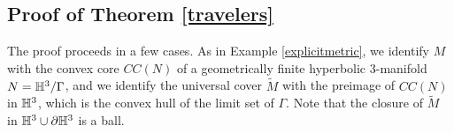 \documentclass[12pt]{amsart}
\theoremstyle{definition}
\theoremstyle{remark}
\begin{document}
%
%
%
%









\subsection{Proof of Theorem \ref{travelers}}
\label{travelerspf}
The proof proceeds in a few cases. As in Example \ref{explicitmetric}, we identify $M$ with the convex core $CC(N)$ of a geometrically finite hyperbolic $3$-manifold $N=\mathbb H^3 / \Gamma$, and we identify the universal cover $\tilde M$ with the preimage of $CC(N)$ in $\mathbb H^3$, which is the convex hull of the limit set of $\Gamma$. Note that the closure of $\tilde M$ in $\mathbb H^3 \cup \partial \mathbb H^3$ is a ball.
\end{document}
